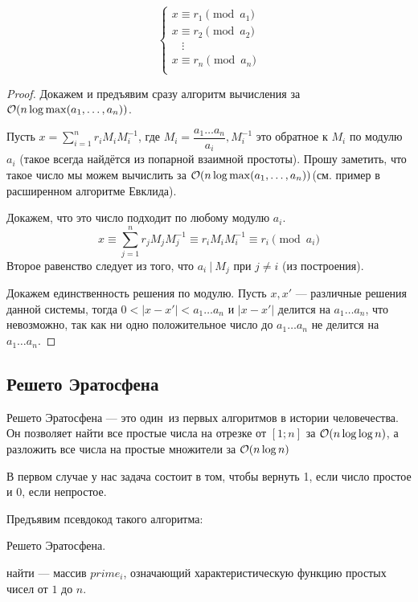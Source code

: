 \documentclass[a4paper, 12pt]{article}
\begin{document}
\[
  \begin{cases}
    x \equiv r_1 \pmod{a_1} \\
    x \equiv r_2 \pmod{a_2} \\
    ~~~~\vdots \\
    x \equiv r_n \pmod{a_n} \\
  \end{cases}
\]

\begin{proof}
  Докажем и предъявим сразу алгоритм вычисления за $\mathcal{O}(n \log \max(a_1, \ldots, a_n))$.

  Пусть $x = \sum\limits_{i = 1}^n r_i M_i M_i^{-1}$, где $M_i = \dfrac{a_1\ldots a_n}{a_i},
  M_i^{-1}$ это обратное к $M_i$ по модулю $a_i$ (такое всегда найдётся из
  попарной взаимной простоты). Прошу заметить, что такое
  число мы можем вычислить за $\mathcal{O}(n \log \max(a_1, \ldots, a_n))$(см. пример в 
  расширенном алгоритме Евклида). 

  Докажем, что это число подходит по любому модулю $a_i$.
  \[
    x \equiv \sum\limits_{j = 1}^n r_jM_jM_j^{-1} \equiv r_iM_iM_i^{-1} \equiv r_i \pmod{a_i}
  \]
  Второе равенство следует из того, что $a_i \ | \ M_j$ при $j \neq i$ (из построения).

  Докажем единственность решения по модулю. Пусть $x, x'$ --- различные решения
  данной системы, тогда $0<|x - x'| < a_1 \ldots a_n$ и $|x  - x'|$ делится
  на $a_1 \ldots a_n$, что невозможно, так как ни одно положительное число до
  $a_1 \ldots a_n$ не делится на $a_1 \ldots a_n$.
\end{proof}

\subsection{Решето Эратосфена}

Решето Эратосфена --- это один~из первых алгоритмов в истории человечества. Он
позволяет найти все простые числа на отрезке от $[1; n]$ за $\mathcal{O}(n\log\log n)$, а
разложить все числа на простые множители за $\mathcal{O}(n\log n)$

В первом случае у нас задача состоит в том, чтобы вернуть 1, если число простое 
и 0, если непростое.

Предъявим псевдокод такого алгоритма:

\begin{algorithm}
  \caption{Решето Эратосфена.}
  \begin{algorithmic}[1]
     \Comment найти --- массив $prime_i$,
    означающий характеристическую функцию простых чисел от $1$ до $n$.
    \EndFor
        \EndWhile
      \EndIf
    \EndFor
    \EndFunction
  \end{algorithmic}
\end{algorithm}
\end{document}
